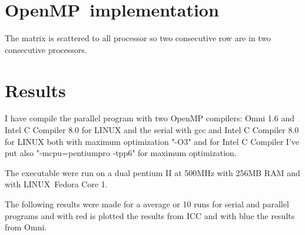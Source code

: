 \documentclass[a4paper]{article}
\begin{document}
\section{OpenMP\ implementation}

\bigskip The matrix is scattered to all processor so two consecutive row are
in two consecutive processors.

\section{Results}

I have compile the parallel program with two OpenMP compilers: Omni 1.6 and
Intel C Compiler 8.0 for LINUX and the serial with gcc and Intel C Compiler
8.0 for LINUX both with maximum optimization "-O3" and for Intel C Compiler
I've put also "-mcpu=pentiumpro -tpp6" for maximum optimization.

The executable were run on a dual pentium II at 500MHz with 256MB RAM and
with LINUX\ Fedora Core 1.

The following results were made for a average or 10 runs for serial and
parallel programs and with red is plotted the results from ICC and with blue
the results from Omni.

\begin{center}
\end{center}
\end{document}

